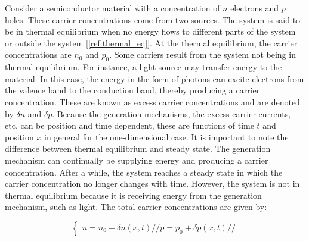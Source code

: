 Consider a semiconductor material with a concentration of $n$ electrons and $p$ holes. These carrier concentrations come from two sources. The system is said to be in thermal equilibrium when no energy flows to different parts of the system or outside the system [\ref{ref:thermal_eq}]. At the thermal equilibrium, the carrier concentrations are $n_0$ and $p_0$.
Some carriers result from the system not being in thermal equilibrium. For instance, a light source may transfer energy to the material. In this case, the energy in the form of photons can excite electrons from the valence band to the conduction band, thereby producing a carrier concentration. These are known as excess carrier concentrations and are denoted by $\delta n$ and $\delta p$. Because the generation mechanisms, the excess carrier currents, etc. can be position and time dependent, these are functions of time $t$ and position $x$ in general for the one-dimensional case.
It is important to note the difference between thermal equilibrium and steady state. The generation mechanism can continually be supplying energy and producing a carrier concentration. After a while, the system reaches a steady state in which the carrier concentration no longer changes with time. However, the system is not in thermal equilibrium because it is receiving energy from the generation mechanism, such as light.
The total carrier concentrations are given by:

\begin{equation}
	\label{eq:carrier_conc}
	\begin{cases}
		n = n_0 + \delta n(x,t) //
		p = p_0 + \delta p(x,t) //
	\end{cases}
\end{equation}

